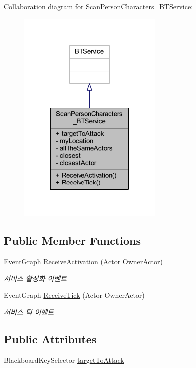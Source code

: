 Collaboration diagram for Scan\+Person\+Characters\+\_\+\+B\+T\+Service\+:\nopagebreak
\begin{figure}[H]
\begin{center}
\leavevmode
\includegraphics[width=197pt]{class_scan_person_characters___b_t_service__coll__graph}
\end{center}
\end{figure}
\subsection*{Public Member Functions}
\begin{DoxyCompactItemize}
\item 
Event\+Graph \hyperlink{class_scan_person_characters___b_t_service_a90dbc45fd45cc38344f5bd0f6a1cb211}{Receive\+Activation} (Actor Owner\+Actor)
\begin{DoxyCompactList}\small\item\em 서비스 활성화 이벤트 \end{DoxyCompactList}\item 
Event\+Graph \hyperlink{class_scan_person_characters___b_t_service_abc8ccababb4510b7473ad79f67c5f809}{Receive\+Tick} (Actor Owner\+Actor)
\begin{DoxyCompactList}\small\item\em 서비스 틱 이벤트 \end{DoxyCompactList}\end{DoxyCompactItemize}
\subsection*{Public Attributes}
\begin{DoxyCompactItemize}
\item 
Blackboard\+Key\+Selector \hyperlink{class_scan_person_characters___b_t_service_a9c34e715ea6da29e92ca7001672c9115}{target\+To\+Attack}
\end{DoxyCompactItemize}
